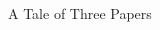 \documentclass[xcolor=table,9pt,aspectratio=169]{beamer}
\begin{document}
\begin{frame}{\vspace*{10mm}A Tale of Three Papers}
\begin{multicols}{3}
\begin{center}

\end{center}
\end{multicols}
\end{frame}
\end{document}
